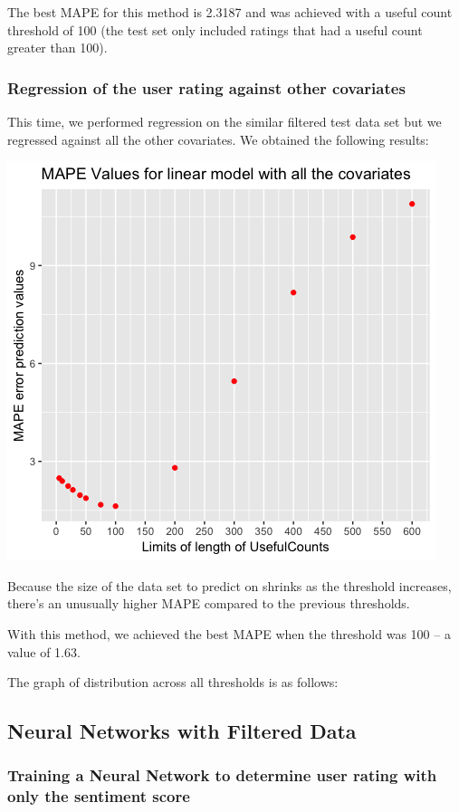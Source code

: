 \documentclass{article}
\begin{document}
The best MAPE for this method is 2.3187 and was achieved with a useful count threshold of 100 (the test set only included ratings that had a useful count greater than 100). 



\subsubsection{Regression of the user rating against other covariates}

This time, we performed regression on the similar filtered test data set but we regressed against all the other covariates. We obtained the following results:

\includegraphics[scale = 0.6]{LRC_filter.png}

Because the size of the data set to predict on shrinks as the threshold increases, there's an unusually higher MAPE compared to the previous thresholds. 

With this method, we achieved the best MAPE when the threshold was 100 -- a value of 1.63.

The graph of distribution across all thresholds is as follows: 


\subsection {Neural Networks with Filtered Data}
\subsubsection{Training a Neural Network to determine user rating with only the sentiment score}
    
\end{document}
